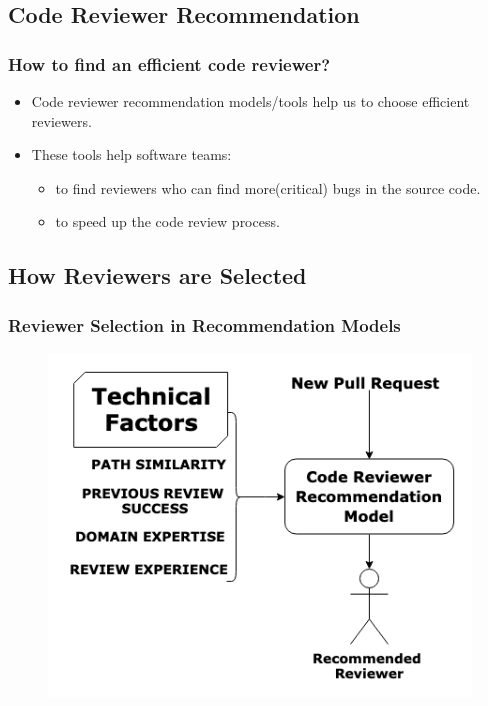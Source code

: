 \documentclass{beamer}
\begin{document}
\subsection{Code Reviewer Recommendation}

\begin{frame}
\frametitle{How to find an efficient code reviewer?}

    \begin{itemize}
    \item Code reviewer recommendation models/tools help us to choose efficient reviewers.
    \item These tools help software teams:
        \begin{itemize}
            \item to find reviewers who can find more(critical) bugs in the source code.
            \item to speed up the code review process.
        \end{itemize}
  \end{itemize}


\end{frame}




\subsection{How Reviewers are Selected}

\begin{frame}
\frametitle{\large Reviewer Selection in Recommendation Models }

  \begin{figure}
    \includegraphics[scale=0.5]{img/algos.png}
    \end{figure}

\end{frame}
\end{document}
